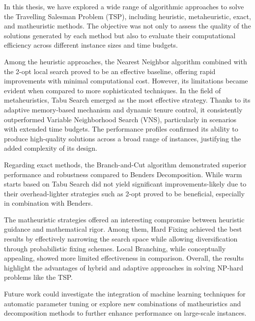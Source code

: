 In this thesis, we have explored a wide range of algorithmic approaches to solve the Travelling Salesman Problem (TSP), including heuristic, metaheuristic, exact, and matheuristic methods. 
The objective was not only to assess the quality of the solutions generated by each method but also to evaluate their computational efficiency across different instance sizes and time budgets.

Among the heuristic approaches, the Nearest Neighbor algorithm combined with the 2-opt local search proved to be an effective baseline, offering rapid improvements with minimal computational cost. However, its limitations became evident when compared to more sophisticated techniques.
In the field of metaheuristics, Tabu Search emerged as the most effective strategy. Thanks to its adaptive memory-based mechanism and dynamic tenure control, it consistently outperformed Variable Neighborhood Search (VNS), particularly in scenarios with extended time budgets. 
The performance profiles confirmed its ability to produce high-quality solutions across a broad range of instances, justifying the added complexity of its design.

Regarding exact methods, the Branch-and-Cut algorithm demonstrated superior performance and robustness compared to Benders Decomposition. 
While warm starts based on Tabu Search did not yield significant improvements-likely due to their overhead-lighter strategies such as 2-opt proved to be beneficial, especially in combination with Benders.

The matheuristic strategies offered an interesting compromise between heuristic guidance and mathematical rigor. Among them, Hard Fixing achieved the best results by effectively narrowing the search space while allowing diversification through probabilistic fixing schemes. Local Branching, while conceptually appealing, showed more limited effectiveness in comparison.
Overall, the results highlight the advantages of hybrid and adaptive approaches in solving NP-hard problems like the TSP. 

Future work could investigate the integration of machine learning techniques for automatic parameter tuning or explore new combinations of matheuristics and decomposition methods to further enhance performance on large-scale instances.